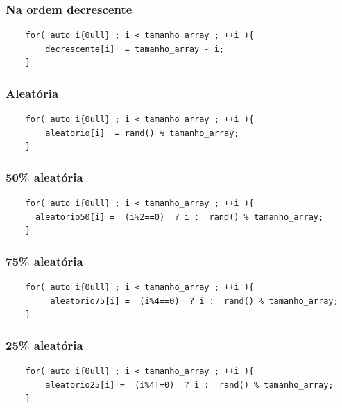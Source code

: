 \documentclass[a4paper, 12pt]{article}
\begin{document}
\subsubsection{Na ordem decrescente}
\begin{lstlisting}
	for( auto i{0ull} ; i < tamanho_array ; ++i ){
		decrescente[i]  = tamanho_array - i;
	}
\end{lstlisting}

\subsubsection{Aleatória}
\begin{lstlisting}
	for( auto i{0ull} ; i < tamanho_array ; ++i ){
		aleatorio[i]  = rand() % tamanho_array;
	}
\end{lstlisting}


\subsubsection{50\% aleatória}
\begin{lstlisting}
    for( auto i{0ull} ; i < tamanho_array ; ++i ){
	  aleatorio50[i] =  (i%2==0)  ? i :  rand() % tamanho_array;
    }
\end{lstlisting}



\subsubsection{75\% aleatória}
\begin{lstlisting}
    for( auto i{0ull} ; i < tamanho_array ; ++i ){
		 aleatorio75[i] =  (i%4==0)  ? i :  rand() % tamanho_array;
	}
\end{lstlisting}


\subsubsection{25\% aleatória}
\begin{lstlisting}
    for( auto i{0ull} ; i < tamanho_array ; ++i ){
		aleatorio25[i] =  (i%4!=0)  ? i :  rand() % tamanho_array;
	}
\end{lstlisting}
\end{document}
